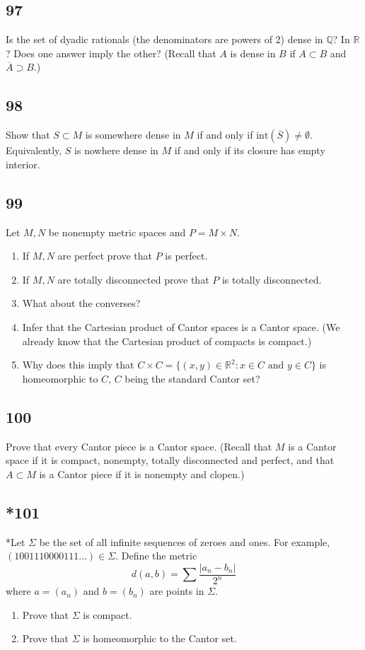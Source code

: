 \documentclass{amsart}
\begin{document}
\subsection*{97}
Is the set of dyadic rationals (the denominators are powers of 2) dense in $\mathbb{Q}$? In $\mathbb{R}$? Does one answer imply the other? (Recall that $A$ is dense in $B$ if $A \subset B$ and $\overline{A} \supset B$.)

\subsection*{98}
Show that $S \subset M$ is somewhere dense in $M$ if and only if $\mathrm{int}(\overline{S}) \ne \emptyset$. Equivalently, $S$ is nowhere dense in $M$ if and only if its closure has empty interior.

\subsection*{99}
Let $M, N$ be nonempty metric spaces and $P = M \times N$.
\begin{enumerate}[label=(\alph*)]
\item If $M, N$ are perfect prove that $P$ is perfect.
\item If $M, N$ are totally disconnected prove that $P$ is totally disconnected.
\item What about the converses?
\item Infer that the Cartesian product of Cantor spaces is a Cantor space. (We already know that the Cartesian product of compacts is compact.)
\item Why does this imply that $C \times C = \{(x,y) \in \mathbb{R}^2 : x \in C \text{ and } y \in C\}$ is homeomorphic to $C$, $C$ being the standard Cantor set?
\end{enumerate}

\subsection*{100}
Prove that every Cantor piece is a Cantor space. (Recall that $M$ is a Cantor space if it is compact, nonempty, totally disconnected and perfect, and that $A \subset M$ is a Cantor piece if it is nonempty and clopen.)

\subsection*{*101}
*Let $\Sigma$ be the set of all infinite sequences of zeroes and ones. For example, $(1001110000111\ldots) \in \Sigma$. Define the metric
\[
d(a,b) = \sum \frac{|a_n - b_n|}{2^n}
\]
where $a=(a_n)$ and $b=(b_n)$ are points in $\Sigma$.
\begin{enumerate}[label=(\alph*)]
\item Prove that $\Sigma$ is compact.
\item Prove that $\Sigma$ is homeomorphic to the Cantor set.
\end{enumerate}
\end{document}
